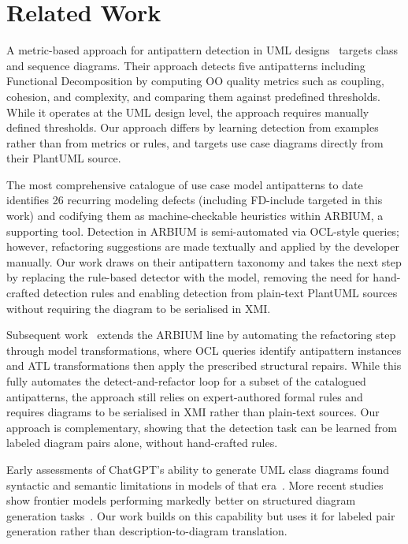 \documentclass[sigconf,review,anonymous]{acmart}
\begin{document}
\section{Related Work}
\label{sec:related}


A metric-based approach for antipattern detection in UML designs~\cite{fourati2011metric} targets class and sequence diagrams.
Their approach detects five antipatterns including Functional Decomposition
by computing OO quality metrics such as coupling, cohesion, and complexity,
and comparing them against predefined thresholds.  While it operates at the
UML design level, the approach requires manually defined thresholds.  Our approach differs by learning detection
from examples rather than from metrics or rules, and targets use case diagrams
directly from their PlantUML source.

The most comprehensive catalogue of use case model antipatterns to date~\cite{elattar2010improving} identifies 26 recurring
modeling defects (including FD-include targeted in this work) and codifying them as machine-checkable heuristics within
ARBIUM, a supporting tool.  Detection in ARBIUM is semi-automated via
OCL-style queries; however, refactoring suggestions are made textually and
applied by the developer manually.  Our work draws on their antipattern
taxonomy and takes the next step by replacing the rule-based detector with the model, removing the need for hand-crafted detection rules and
enabling detection from plain-text PlantUML sources without requiring the diagram to be serialised in XMI.

Subsequent work~\cite{khan2016model} extends the ARBIUM line by
automating the refactoring step through model transformations, where OCL queries
identify antipattern instances and ATL transformations then apply the
prescribed structural repairs.  While this fully automates the
detect-and-refactor loop for a subset of the catalogued antipatterns, the
approach still relies on expert-authored formal rules and requires diagrams to be serialised in XMI rather than plain-text sources.  Our
approach is complementary, showing that the detection task can be learned
from labeled diagram pairs alone, without hand-crafted rules.


Early assessments of ChatGPT's ability to generate UML class diagrams found
syntactic and semantic limitations in models of that era~\cite{camara2023chatgptuml}.
More recent studies show frontier models performing markedly better on
structured diagram generation tasks~\cite{enase26,alsayegh2026stride}.
Our work builds on this capability but uses it for labeled pair
generation rather than description-to-diagram translation.
\end{document}
